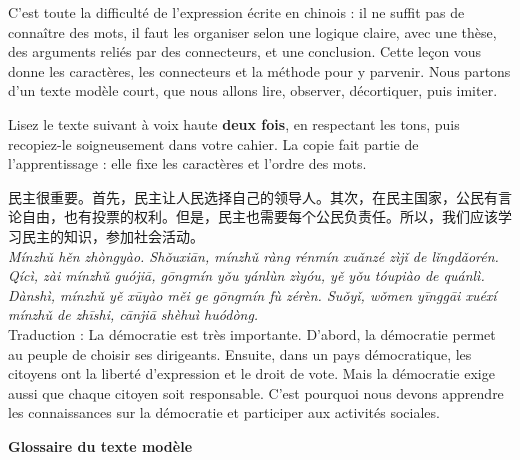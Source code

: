\documentclass[11pt]{article}
\newcounter{popsec}
\newcounter{popsub}
\newcommand{\courssub}[1]{%
  \stepcounter{popsub}%
  \par\vspace{9pt}\noindent{\popxbold\fontsize{11.5}{13}\selectfont\color{popink}{\color{poporange}\thepopsec.\thepopsub}\hspace{6pt}#1}\par\nopagebreak\vspace{4pt}
}
\begin{document}
C'est toute la difficulté de l'expression écrite en chinois : il ne suffit pas de connaître des mots, il faut les organiser selon une logique claire, avec une thèse, des arguments reliés par des connecteurs, et une conclusion. Cette leçon vous donne les caractères, les connecteurs et la méthode pour y parvenir. Nous partons d'un texte modèle court, que nous allons lire, observer, décortiquer, puis imiter.

\courssub{Lecture du texte modèle}

Lisez le texte suivant à voix haute \textbf{deux fois}, en respectant les tons, puis recopiez-le soigneusement dans votre cahier. La copie fait partie de l'apprentissage : elle fixe les caractères et l'ordre des mots.

\begin{textebox}
民主很重要。首先，民主让人民选择自己的领导人。其次，在民主国家，公民有言论自由，也有投票的权利。但是，民主也需要每个公民负责任。所以，我们应该学习民主的知识，参加社会活动。\\
\emph{Mínzhǔ hěn zhòngyào. Shǒuxiān, mínzhǔ ràng rénmín xuǎnzé zìjǐ de lǐngdǎorén. Qícì, zài mínzhǔ guójiā, gōngmín yǒu yánlùn zìyóu, yě yǒu tóupiào de quánlì. Dànshì, mínzhǔ yě xūyào měi ge gōngmín fù zérèn. Suǒyǐ, wǒmen yīnggāi xuéxí mínzhǔ de zhīshi, cānjiā shèhuì huódòng.}\\
Traduction : La démocratie est très importante. D'abord, la démocratie permet au peuple de choisir ses dirigeants. Ensuite, dans un pays démocratique, les citoyens ont la liberté d'expression et le droit de vote. Mais la démocratie exige aussi que chaque citoyen soit responsable. C'est pourquoi nous devons apprendre les connaissances sur la démocratie et participer aux activités sociales.
\end{textebox}

\textbf{Glossaire du texte modèle}
\end{document}
